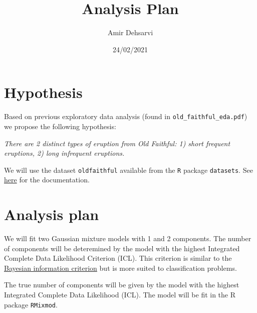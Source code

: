 \documentclass[
]{article}
\title{Analysis Plan}
\author{Amir Dehsarvi}
\date{24/02/2021}
\begin{document}
\maketitle

\hypertarget{hypothesis}{%
\section{Hypothesis}\label{hypothesis}}

Based on previous exploratory data analysis (found in
\texttt{old\_faithful\_eda.pdf}) we propose the following hypothesis:

\emph{There are 2 distinct types of eruption from Old Faithful: 1) short
frequent eruptions, 2) long infrequent eruptions.}

We will use the dataset \texttt{oldfaithful} available from the
\texttt{R} package \texttt{datasets}. See
\href{https://stat.ethz.ch/R-manual/R-devel/library/datasets/html/faithful.html}{here}
for the documentation.

\hypertarget{analysis-plan}{%
\section{Analysis plan}\label{analysis-plan}}

We will fit two Gaussian mixture models with 1 and 2 components. The
number of components will be deteremined by the model with the highest
Integrated Complete Data Likelihood Criterion (ICL). This criterion is
similar to the
\href{https://en.wikipedia.org/wiki/Bayesian_information_criterion}{Bayesian
information criterion} but is more suited to classification problems.

The true number of components will be given by the model with the
highest Integrated Complete Data Likelihood (ICL). The model will be fit
in the R package \texttt{RMixmod}.
\end{document}
